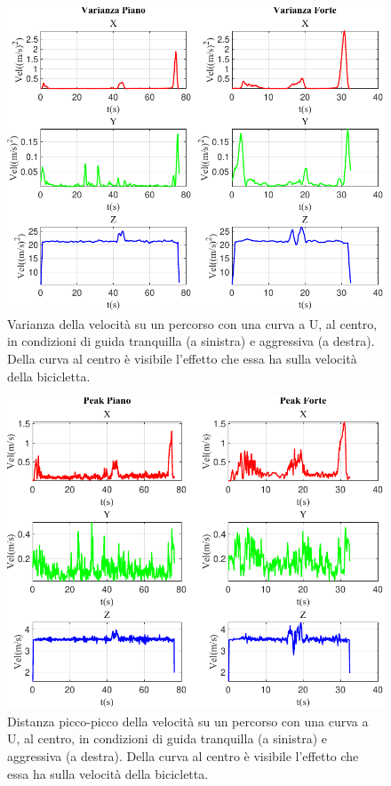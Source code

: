 \documentclass[class=article]{standalone}
\begin{document}
	\begin{center}
		\begin{figure}[h!]
			\centering\includegraphics[width=.7\textwidth]{img/curvaUFP/Vel/Varianza}
			\caption[]{Varianza della velocità su un percorso con una curva a U, al centro, in condizioni di guida tranquilla (a sinistra) e aggressiva (a destra). Della curva al centro è visibile l'effetto che essa ha sulla velocità della bicicletta.}
			\label{fig:VelVar_curvaUFP}
		\end{figure}
	\end{center}
	\newpage
	\begin{center}
		\begin{figure}[h!]
			\centering\includegraphics[width=.7\textwidth]{img/curvaUFP/Vel/Peak}
			\caption[]{Distanza picco-picco della velocità su un percorso con una curva a U, al centro, in condizioni di guida tranquilla (a sinistra) e aggressiva (a destra). Della curva al centro è visibile l'effetto che essa ha sulla velocità della bicicletta.}
			\label{fig:VelPeak_curvaUFP}
		\end{figure}
	\end{center}
	
\end{document}
